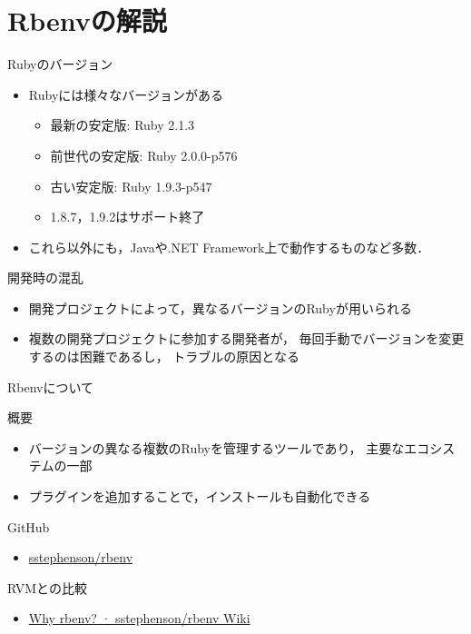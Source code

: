 \documentclass[t, aspectratio=169]{beamer}
\begin{document}
\section{Rbenvの解説}
\label{sec-3-1}
\begin{frame}[label=sec-3-1-1]{Rubyのバージョン}
\begin{itemize}
\item Rubyには様々なバージョンがある
\begin{itemize}
\item 最新の安定版: Ruby 2.1.3
\item 前世代の安定版: Ruby 2.0.0-p576
\item 古い安定版: Ruby 1.9.3-p547
\item 1.8.7，1.9.2はサポート終了
\end{itemize}
\item これら以外にも，Javaや.NET Framework上で動作するものなど多数．
\end{itemize}
\end{frame}
\begin{frame}[label=sec-3-1-2]{開発時の混乱}
\begin{itemize}
\item 開発プロジェクトによって，異なるバージョンのRubyが用いられる
\item 複数の開発プロジェクトに参加する開発者が，
毎回手動でバージョンを変更するのは困難であるし，
トラブルの原因となる
\end{itemize}
\end{frame}
\begin{frame}[label=sec-3-1-3]{Rbenvについて}
\begin{block}{概要}
\begin{itemize}
\item バージョンの異なる複数のRubyを管理するツールであり，
主要なエコシステムの一部
\item プラグインを追加することで，インストールも自動化できる
\end{itemize}
\end{block}
\begin{block}{GitHub}
\begin{itemize}
\item \href{https://github.com/sstephenson/rbenv}{sstephenson/rbenv}
\end{itemize}
\end{block}
\begin{block}{RVMとの比較}
\begin{itemize}
\item \href{https://github.com/sstephenson/rbenv/wiki/Why-rbenv\%3F}{Why rbenv? · sstephenson/rbenv Wiki}
\end{itemize}
\end{block}
\end{frame}
\end{document}
